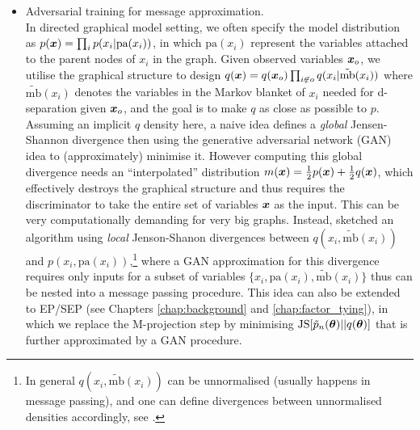 \begin{itemize}
\item Adversarial training for message approximation. \\
In directed graphical model setting, we often specify the model distribution as $p(\bm{x}) = \prod_{i} p(x_i | \text{pa}(x_i))$, in which $\text{pa}(x_i)$ represent the variables attached to the parent nodes of $x_i$ in the graph. Given observed variables $\bm{x}_{o}$, we utilise the graphical structure to design $q(\bm{x}) = q(\bm{x}_o) \prod_{i \not\in o} q(x_i | \tilde{\text{mb}}(x_i))$ where $\tilde{\text{mb}}(x_i)$ denotes the variables in the Markov blanket of $x_i$ needed for d-separation given $\bm{x}_o$, and the goal is to make $q$ as close as possible to $p$. Assuming an implicit $q$ density here, a naive idea defines a \emph{global} Jensen-Shannon divergence \citep{lin:jensen_shannon1991} then using the generative adversarial network (GAN) \citep{goodfellow:gan2014} idea to (approximately) minimise it. However computing this global divergence needs an ``interpolated'' distribution $m(\bm{x}) = \frac{1}{2} p(\bm{x}) + \frac{1}{2} q(\bm{x})$, which effectively destroys the graphical structure and thus requires the discriminator to take the entire set of variables $\bm{x}$ as the input. This can be very computationally demanding for very big graphs. Instead, \cite{karaletsos:adversarial_mp2016} sketched an algorithm using \emph{local} Jenson-Shanon divergences between $q(x_i, \tilde{\text{mb}}(x_i))$ and $p(x_i, \text{pa}(x_i))$,\footnote{In general $q(x_i, \tilde{\text{mb}}(x_i))$ can be unnormalised (usually happens in message passing), and one can define divergences between unnormalised densities accordingly, see \citet{minka:divergence2005}. } where a GAN approximation for this divergence requires only inputs for a subset of variables $\{ x_i, \text{pa}(x_i), \tilde{\text{mb}}(x_i) \}$ thus can be nested into a message passing procedure. This idea can also be extended to EP/SEP (see Chapters \ref{chap:background} and \ref{chap:factor_tying}), in which we replace the M-projection step by minimising $\mathrm{JS}[\tilde{p}_n(\bm{\theta}) || q(\bm{\theta})]$ that is further approximated by a GAN procedure.


\end{itemize}
